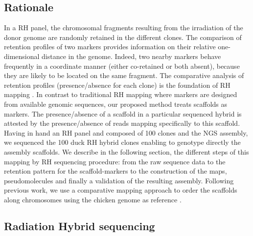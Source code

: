 \documentclass[10pt,letterpaper]{article}
\begin{document}
\subsection*{Rationale}
In a RH panel, the chromosomal fragments resulting from the irradiation of the donor genome are randomly retained in the different clones. The comparison of retention profiles of two markers provides information on their relative one-dimensional distance in the genome. Indeed, two nearby markers behave frequently in a coordinate manner (either co-retained or both absent), because they are likely to be located on the same fragment. The comparative analysis of retention profiles (presence/absence for each clone) is the foundation of RH mapping \cite{Cox1990, Faraut2009}. 
In contrast to traditional RH mapping where markers are designed from available genomic sequences, our proposed method treats scaffolds as markers. 
The presence/absence of a scaffold in a particular sequenced hybrid is attested by the presence/absence of reads mapping specifically to this scaffold. 
Having in hand an RH panel and composed of 100 clones and the NGS assembly, we sequenced the 100 duck RH hybrid clones enabling to genotype directly the assembly scaffolds. 
We describe in the following section, the different steps of this mapping by RH sequencing procedure: from the raw sequence data to the retention pattern for the scaffold-markers to the construction of the maps, pseudomolecules and finally a validation of the resulting assembly. 
Following previous work, we use a comparative mapping approach to order the scaffolds along chromosomes using the chicken genome as reference \cite{Faraut2007}.

\subsection*{Radiation Hybrid sequencing}
\end{document}
